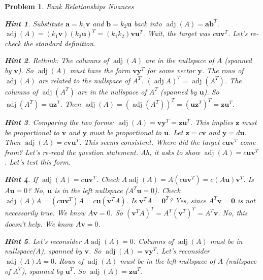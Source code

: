 \documentclass[12pt]{article}
\newtheorem{problem}{Problem}[section]
\theoremstyle{definition}
\newtheorem{hint}{Hint}[question]
\newcommand{\adj}{\operatorname{adj}}
\newcommand{\vect}[1]{\mathbf{#1}} %
\begin{document}
\begin{problem}{Rank Relationships Nuances}
    \begin{hint}
        Substitute $\vect{a} = k_1 \vect{v}$ and $\vect{b} = k_2 \vect{u}$ back into $\adj(A) = \vect{a} \vect{b}^T$.
        $\adj(A) = (k_1 \vect{v}) (k_2 \vect{u})^T = (k_1 k_2) \vect{v} \vect{u}^T$. Wait, the target was $c \vect{u} \vect{v}^T$. Let's re-check the standard definition.
    \end{hint}
    \begin{hint}
        Rethink: The columns of $\adj(A)$ are in the nullspace of $A$ (spanned by $\vect{v}$). So $\adj(A)$ must have the form $\vect{v} \vect{y}^T$ for some vector $\vect{y}$.
        The rows of $\adj(A)$ are related to the nullspace of $A^T$. $(\adj A)^T = \adj(A^T)$. The columns of $\adj(A^T)$ are in the nullspace of $A^T$ (spanned by $\vect{u}$). So $\adj(A^T) = \vect{u} \vect{z}^T$.
        Then $\adj(A) = (\adj(A^T))^T = (\vect{u} \vect{z}^T)^T = \vect{z} \vect{u}^T$.
    \end{hint}
    \begin{hint}
        Comparing the two forms: $\adj(A) = \vect{v} \vect{y}^T = \vect{z} \vect{u}^T$.
        This implies $\vect{z}$ must be proportional to $\vect{v}$ and $\vect{y}$ must be proportional to $\vect{u}$.
        Let $\vect{z} = c \vect{v}$ and $\vect{y} = d \vect{u}$.
        Then $\adj(A) = c \vect{v} \vect{u}^T$. This seems consistent. Where did the target $c \vect{u} \vect{v}^T$ come from? Let's re-read the question statement. Ah, it asks to show $\adj(A) = c \vect{u} \vect{v}^T$. Let's test this form.
    \end{hint}
    \begin{hint}
        If $\adj(A) = c \vect{u} \vect{v}^T$. Check $A \adj(A) = A (c \vect{u} \vect{v}^T) = c (A\vect{u}) \vect{v}^T$. Is $A\vect{u}=0$? No, $\vect{u}$ is in the left nullspace ($A^T \vect{u}=0$).
        Check $\adj(A) A = (c \vect{u} \vect{v}^T) A = c \vect{u} (\vect{v}^T A)$. Is $\vect{v}^T A = \vect{0}^T$? Yes, since $A^T \vect{v} = \vect{0}$ is not necessarily true. We know $A\vect{v}=0$. So $(\vect{v}^T A)^T = A^T (\vect{v}^T)^T = A^T \vect{v}$. No, this doesn't help. We know $A\vect{v}=0$.
    \end{hint}
    \begin{hint}
        Let's reconsider $A \adj(A) = 0$. Columns of $\adj(A)$ must be in nullspace(A), spanned by $\vect{v}$. So $\adj(A) = \vect{v} \vect{y}^T$.
        Let's reconsider $\adj(A) A = 0$. Rows of $\adj(A)$ must be in the left nullspace of $A$ (nullspace of $A^T$), spanned by $\vect{u}^T$. So $\adj(A) = \vect{z} \vect{u}^T$.

\end{hint}
\end{problem}
\end{document}
